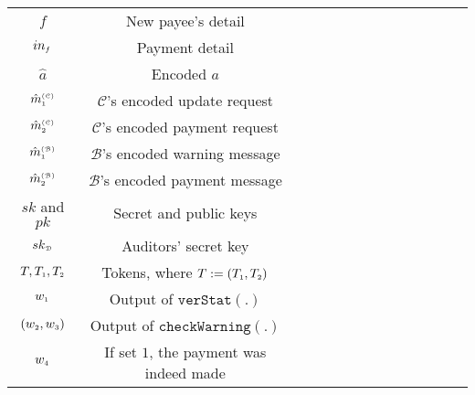 \begin{table}[!htbp]
\begin{scriptsize}
\begin{center}
{{\begin{tabular}{|c|c|c|c|c|c|c|c|c|c|c|c|c|c|}
%               
\cellcolor{white!20}\scriptsize$f$ &\cellcolor{white!20}\scriptsize New payee’s detail  \\ 
\cellcolor{gray!20}\scriptsize$in_{\scriptscriptstyle f}$ &\cellcolor{gray!20}\scriptsize Payment detail \\ 
%
  \cellcolor{white!20}\scriptsize$\hat a$ &\cellcolor{white!20}\scriptsize Encoded $a$ \\     
%
\cellcolor{gray!20}\scriptsize$\hat {m}^{\scriptscriptstyle(\mathcal{C})}_{\scriptscriptstyle 1}$ &\cellcolor{gray!20}\scriptsize $\mathcal{C}$'s encoded update request\\     
%
\cellcolor{white!20}\scriptsize$\hat {m}^{\scriptscriptstyle(\mathcal{C})}_{\scriptscriptstyle 2}$ &\cellcolor{white!20}\scriptsize $\mathcal{C}$'s encoded payment request\\     
%      
\cellcolor{gray!20}\scriptsize$\hat {m}^{\scriptscriptstyle(\mathcal{B})}_{\scriptscriptstyle 1}$ &\cellcolor{gray!20}\scriptsize $\mathcal{B}$'s encoded warning message\\     
%
\cellcolor{white!20}\scriptsize$\hat {m}^{\scriptscriptstyle(\mathcal{B})}_{\scriptscriptstyle 2}$ &\cellcolor{white!20}\scriptsize $\mathcal{B}$'s encoded payment message\\     
%          
     \cellcolor{gray!20}\scriptsize$sk$ and $pk$ &\cellcolor{gray!20}\scriptsize Secret  and public keys\\     
%
   \cellcolor{white!20}\scriptsize$sk_{\scriptscriptstyle\mathcal{D}}$ &\cellcolor{white!20}\scriptsize Auditors' secret key\\     
%    
%
%
\cellcolor{gray!20}\scriptsize$T, T_{\scriptscriptstyle 1},T_{\scriptscriptstyle 2}$ &\cellcolor{gray!20}\scriptsize  Tokens, where  $T:=( T_{\scriptscriptstyle 1},T_{\scriptscriptstyle 2})$\\ 
%
%
%
\cellcolor{white!20}\scriptsize$w_{\scriptscriptstyle 1}$ &\cellcolor{white!20}\scriptsize  Output of $\mathtt{verStat}(.)$\\ 
%
\cellcolor{gray!20}\scriptsize$(w_{\scriptscriptstyle 2},w_{\scriptscriptstyle 3})$ &\cellcolor{gray!20}\scriptsize  Output of $\mathtt{checkWarning}(.)$\\ 
%
\cellcolor{white!20}\scriptsize$w_{\scriptscriptstyle 4}$ &\cellcolor{white!20}\scriptsize  If set $1$, the payment was indeed made\\ 

\end{tabular}}}
\end{center}
\end{scriptsize}
\end{table}
